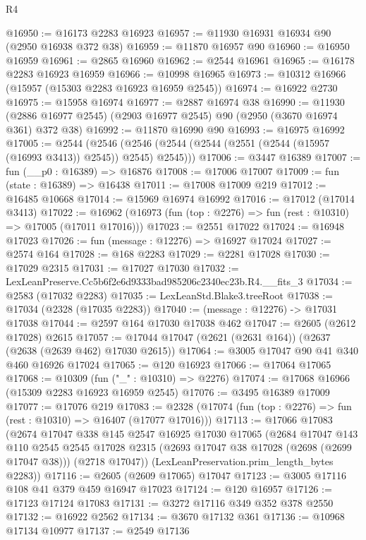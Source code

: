 \begin{lexlean}{R4}
\begin{coremodule}
@16950 := @16173 @2283 @16923
@16957 := @11930 @16931 @16934 @90 (@2950 @16938 @372 @38)
@16959 := @11870 @16957 @90
@16960 := @16950 @16959
@16961 := @2865 @16960
@16962 := @2544 @16961
@16965 := @16178 @2283 @16923 @16959
@16966 := @10998 @16965
@16973 := @10312 @16966 (@15957 (@15303 @2283 @16923 @16959 @2545))
@16974 := @16922 @2730
@16975 := @15958 @16974
@16977 := @2887 @16974 @38
@16990 := @11930 (@2886 @16977 @2545) (@2903 @16977 @2545) @90 (@2950 (@3670 @16974 @361) @372 @38)
@16992 := @11870 @16990 @90
@16993 := @16975 @16992
@17005 := @2544
    (@2546 (@2546 (@2544 (@2544 (@2551 (@2544 (@15957 (@16993 @3413)) @2545)) @2545) @2545)))
@17006 := @3447 @16389
@17007 := fun (__p0 : @16389) => @16876
@17008 := @17006 @17007
@17009 := fun (state : @16389) => @16438
@17011 := @17008 @17009 @219
@17012 := @16485 @10668
@17014 := @15969 @16974 @16992
@17016 := @17012 (@17014 @3413)
@17022 := @16962 (@16973 (fun (top : @2276) => fun (rest : @10310) => @17005 (@17011 @17016)))
@17023 := @2551 @17022
@17024 := @16948 @17023
@17026 := fun (message : @12276) => @16927 @17024
@17027 := @2574 @164
@17028 := @168 @2283
@17029 := @2281 @17028
@17030 := @17029 @2315
@17031 := @17027 @17030
@17032 := LexLeanPreserve.Cc5b6f2e6d9333bad985206c2340ec23b.R4.__fits_3
@17034 := @2583 (@17032 @2283)
@17035 := LexLeanStd.Blake3.treeRoot
@17038 := @17034 (@2328 (@17035 @2283))
@17040 := (message : @12276) -> @17031 @17038
@17044 := @2597 @164 @17030 @17038 @462
@17047 := @2605 (@2612 @17028) @2615
@17057 := @17044 @17047 (@2621 (@2631 @164)) (@2637 (@2638 (@2639 @462) @17030 @2615))
@17064 := @3005 @17047 @90 @41 @340 @460 @16926 @17024
@17065 := @120 @16923
@17066 := @17064 @17065
@17068 := @10309 (fun ("_" : @10310) => @2276)
@17074 := @17068 @16966 (@15309 @2283 @16923 @16959 @2545)
@17076 := @3495 @16389 @17009
@17077 := @17076 @219
@17083 := @2328 (@17074 (fun (top : @2276) => fun (rest : @10310) => @16407 (@17077 @17016)))
@17113 := @17066
    @17083
    (@2674
      @17047
      @338
      @145
      @2547
      @16925
      @17030
      @17065
      (@2684
        @17047
        @143
        @110
        @2545
        @2545
        @17028
        @2315
        (@2693 @17047 @38 @17028 (@2698 (@2699 @17047 @38)))
        (@2718 @17047))
      (LexLeanPreservation.prim_length_bytes @2283))
@17116 := @2605 (@2609 @17065) @17047
@17123 := @3005 @17116 @108 @41 @379 @459 @16947 @17023
@17124 := @120 @16957
@17126 := @17123 @17124 @17083
@17131 := @3272 @17116 @349 @352 @378 @2550
@17132 := @16922 @2562
@17134 := @3670 @17132 @361
@17136 := @10968 @17134 @10977
@17137 := @2549 @17136

\end{coremodule}
\end{lexlean}
